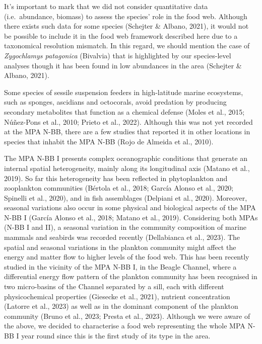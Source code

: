 \documentclass[preprint, 3p,
authoryear]{elsarticle} %
\begin{document}
It's important to mark that we did not consider quantitative data
(i.e.~abundance, biomass) to assess the species' role in the food web.
Although there exists such data for some species (Schejter \& Albano,
2021), it would not be possible to include it in the food web framework
described here due to a taxonomical resolution mismatch. In this regard,
we should mention the case of \emph{Zygochlamys patagonica} (Bivalvia)
that is highlighted by our species-level analyses though it has been
found in low abundances in the area (Schejter \& Albano, 2021).

Some species of sessile suspension feeders in high-latitude marine
ecosystems, such as sponges, ascidians and octocorals, avoid predation
by producing secondary metabolites that function as a chemical defense
(Moles et al., 2015; Núñez-Pons et al., 2010; Prieto et al., 2022).
Although this was not yet recorded at the MPA N-BB, there are a few
studies that reported it in other locations in species that inhabit the
MPA N-BB (Rojo de Almeida et al., 2010).

The MPA N-BB I presents complex oceanographic conditions that generate
an internal spatial heterogeneity, mainly along its longitudinal axis
(Matano et al., 2019). So far this heterogeneity has been reflected in
phytoplankton and zooplankton communities (Bértola et al., 2018; García
Alonso et al., 2020; Spinelli et al., 2020), and in fish assemblages
(Delpiani et al., 2020). Moreover, seasonal variations also occur in
some physical and biological aspects of the MPA N-BB I (García Alonso et
al., 2018; Matano et al., 2019). Considering both MPAs (N-BB I and II),
a seasonal variation in the community composition of marine mammals and
seabirds was recorded recently (Dellabianca et al., 2023). The spatial
and seasonal variations in the plankton community might affect the
energy and matter flow to higher levels of the food web. This has been
recently studied in the vicinity of the MPA N-BB I, in the Beagle
Channel, where a differential energy flow pattern of the plankton
community has been recognised in two micro-basins of the Channel
separated by a sill, each with different physicochemical properties
(Giesecke et al., 2021), nutrient concentration (Latorre et al., 2023)
as well as in the dominant component of the plankton community (Bruno et
al., 2023; Presta et al., 2023). Although we were aware of the above, we
decided to characterise a food web representing the whole MPA N-BB I
year round since this is the first study of its type in the area.
\end{document}

